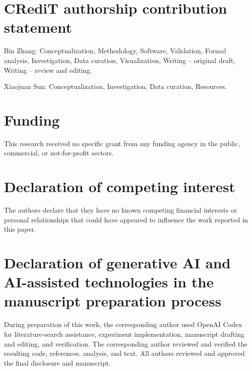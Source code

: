 \documentclass[preprint,12pt]{elsarticle}
\begin{document}
\section*{CRediT authorship contribution statement}
Bin Zhang: Conceptualization, Methodology, Software, Validation, Formal analysis, Investigation, Data curation, Visualization, Writing -- original draft, Writing -- review and editing.

Xiaojuan Sun: Conceptualization, Investigation, Data curation, Resources.

\section*{Funding}
This research received no specific grant from any funding agency in the public, commercial, or not-for-profit sectors.

\section*{Declaration of competing interest}
The authors declare that they have no known competing financial interests or personal relationships that could have appeared to influence the work reported in this paper.

\section*{Declaration of generative AI and AI-assisted technologies in the manuscript preparation process}
During preparation of this work, the corresponding author used OpenAI Codex for literature-search assistance, experiment implementation, manuscript drafting and editing, and verification. The corresponding author reviewed and verified the resulting code, references, analysis, and text. All authors reviewed and approved the final disclosure and manuscript.

\small
\setlength{\bibsep}{1pt}


\end{document}
